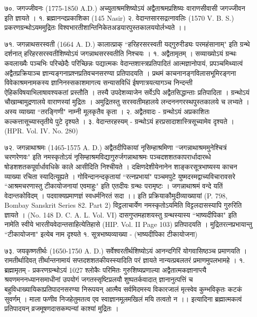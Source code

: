 ७०. जगज्जीवनः (1775-1850 A.D.)
अच्युताश्रमशिष्योऽयं अद्वैताश्रमप्रशिष्यः वाराणसीवासी जगज्जीवन इति ज्ञायते ।
१. ब्रह्मानन्दप्रकाशिका (145 Nasir)
२. वेदान्तसारसद्रत्नावलिः (1570 V. B. S.)
प्रकरणग्रन्थोऽयममुद्रितः विश्वभारतीशान्तिनिकेतअडयारपुस्तकालययोर्लभ्यते ।।

७१. जगन्नाथसरस्वती (1664 A. D.) कालात्प्राक् 
``हरिहरसरस्वती यद्गुरुरीड्यः परमहंसानाम्" इति ग्रन्थे दर्शनात् हरिहरसरस्वतीशिष्योऽयं जगन्नाथसरस्वतीति निश्चयः ।
१. अद्वैतामृतम् ।
सव्याख्योऽयं ग्रन्थः कवलाख्यैः पञ्चभिः परिच्छेदैः परिच्छिन्नः पद्यात्मकः वेदान्तशास्त्रप्रतिपादितं आत्मज्ञानोपायं, प्रपञ्चमिथ्यात्वं अद्वैतप्रक्रियाञ्च ज्ञान्यङ्गनाप्रश्नप्रतिवचनसरण्या प्रतिपादयति । प्रथमं काचनानङ्गविलासभूमिरङ्गना विवेकाश्रमनामकस्य ज्ञानिनस्सकाशमागत्य सन्यासविधिं ईषणात्रयत्यागञ्च निन्दन्ती ऐहिकविषयाभिलाषावश्यकतां प्रस्तौति । तस्यै उपदेशव्याजेन सर्वेऽपि अद्वैतसिद्धान्ताः प्रतिपादिता । ग्रन्थोऽयं चौखाम्बामुद्रणालये वाराणस्यां मुद्रितः । अमुद्रितस्तु सरस्वतीमहालये लन्दननगरस्थपुस्तकालये च लभ्यते । अस्य व्याख्या ``तरङ्गिणी" नाम्नी मूलकृतैव कृता ।
२. अद्वैतवादः - ग्रन्थोऽयं अप्रकाशितः कल्कत्तासूच्यास्तृतीये पुटे दृश्यते ।
३. वेदान्तरहस्यम् - ग्रन्थोऽयं हरप्रसादाशास्त्रिसूच्यामेव दृश्यते । (HPR. Vol. IV. No. 280)

७२. जगन्नाथाश्रमः (1465-1575 A. D.)
अद्वैतदीपिकायां नृसिम्हाश्रमिणा ``जगन्नाथाश्रममुनेश्चित्रं चरणरेणवः" इति नमस्कृतोऽयं नृसिम्हाश्रमविद्यागुरुर्जगन्नाथाश्रमः पञ्चदशशतकापरार्धादारब्धे षोडशशतकपूर्वार्धावधिके काले आसीदिति निश्चीयते । दक्षिणदेशीयेनानेन शाङ्करसूत्रभाष्यस्य काचन व्याख्या रचिता स्यादित्यूह्यते । गोविन्दानन्दकृतायां ``रत्नप्रभायां" पञ्चमपुटे युष्मदस्मद्वाच्यविचारावसरे ``आश्रमचरणास्तु टीकायोजनायां एवमाहुः" इति एतदीयः ग्रन्थः परामृष्टः ।
जगन्नाथाश्रमं वन्दे यतिं वेदान्तकोविदम् ।
पदवाक्यप्रमाणज्ञं स्वधर्मनिरतं सदा ।।
इति प्रक्रियाकौमुदीव्याख्यायां (P. 798, Bombay Sanskrit Series 82. Part 2) विट्ठलाचार्येण नमस्कृतोऽयमिति विट्टलदासस्यापि गुरुरिति ज्ञायते । (No. 148 D. C. A. L. Vol. VI) 
दासगुप्तमहाशयस्तु ग्रन्थस्यास्य ``भाष्यदीपिका" इति नामेति स्वीये भारतीयवेदान्तसाहित्येतिहासे (HIP. Vol. II Page 103) प्रतिपादयति । मुद्रितरत्नप्रभायान्तु ``टीकायोजना" इत्येब नाम दृश्यते 
१. सूत्रभाष्यव्याख्या - (भाष्यदीपिका टीकायोजना)

७३. जयकृष्णतीर्थः (1650-1750 A. D.)
सर्वेश्वरतीर्थशिष्योऽयं आनन्दगिरिं योगवासिष्ठञ्च प्रमाणयति । रामतीर्थादिवत् तीर्थान्तनामायं सप्तदशशतकीयस्स्यादिति परं ज्ञायते नान्यत्प्रबलतरं प्रमाणमुपलभामहे ।
१. ब्रह्मामृतम् - प्रकरणग्रन्थोऽयं 1027 श्लोकैः परिमितः गुरुशिष्यप्रणाल्या अद्वैतात्मकज्ञानाप्त्यै श्रवणमननध्यानसमाधीनां उपयोगं जगतस्सृष्टिप्रलयौ शुष्पतर्कवादात् ज्ञानानुत्पत्तिं च बहुविधाख्यायिकाप्रतिपादनसरण्या निरूपयन्
आत्मैव सर्वमिदमस्य विकारजालं मृत्स्वेव कुम्भविकृतः कटकं सुवर्णम् ।
माला फणीव निजहेतुमतत्व एव स्वाज्ञानमूलमखिलं मयि तत्वतो न ।।
इत्यादिना ब्रह्मात्मकत्वं प्रतिपादयन् व्रजमूषणदासकम्पन्यां काश्यां मुद्रितः ।


